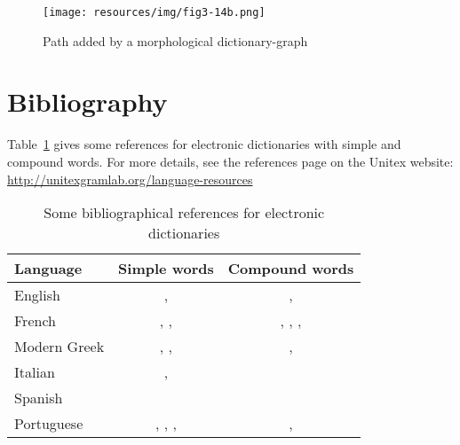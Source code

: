 \begin{figure}[!ht]
\begin{center}
\texttt{[image: resources/img/fig3-14b.png]}
\caption{Path added by a morphological dictionary-graph\label{morphoB}}
\end{center}
\end{figure}


\section{Bibliography}


Table~\ref{ref-dicos} gives some references for electronic dictionaries with simple and 
compound words. For more details, see the references page on the Unitex website: \\
\url{http://unitexgramlab.org/language-resources}

\begin{table}[!ht]
\begin{center}
\begin{tabular}{|l|c|c|}
\hline
\textbf{Language} & \textbf{Simple words} & \textbf{Compound words} \\
\hline
English & \cite{klarsfeld}, \cite{monceaux-1995} & \cite{delac-anglais},
\cite{these-Savary} \\
\hline
French & \cite{formes-ambigues}, \cite{dicos-francais}, \cite{jacques-1995} & \cite{dicos-francais},
\cite{Gross96},
\cite{max-1993},
\cite{syntaxe-de-ladverbe} \\
\hline
Modern Greek & \cite{modern-greek}, \cite{matthieu-anastasia}, \cite{these-tita} & \cite{tita-2002},
\cite{anastasia-2002} \\
\hline
Italian & \cite{delaf-italien}, \cite{delaf-italien-book} & \cite{composes-italien} \\
\hline
Spanish & \cite{blanco-2000} & \cite{blanco-1997} \\
\hline
Portuguese & \cite{eleuterio1995}, \cite{ranchhod1996b}, \cite{ranchhodd1998},
\cite{muniz2005} & \cite{ranchhod1991}, \cite{ranchhodd1998} \\
\hline
\end{tabular}
\caption{Some bibliographical references for electronic dictionaries\label{ref-dicos}}
\end{center}
\end{table}
